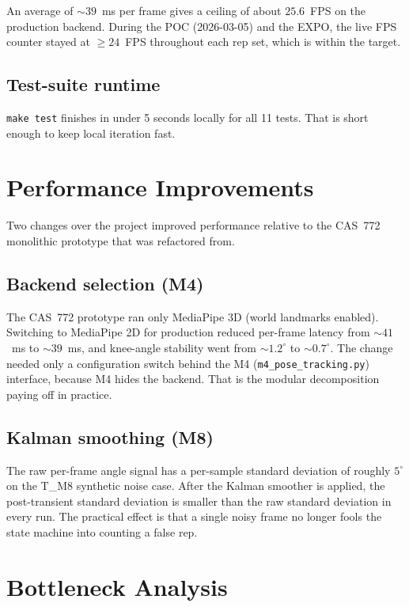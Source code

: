 \documentclass{article}
\begin{document}
An average of $\sim 39$~ms per frame gives a ceiling of about
$25.6$~FPS on the production backend. During the POC (2026-03-05) and
the EXPO, the live FPS counter stayed at $\ge 24$~FPS throughout each
rep set, which is within the target.

\subsection{Test-suite runtime}

\texttt{make test} finishes in under 5 seconds locally for all 11
tests. That is short enough to keep local iteration fast.

\section{Performance Improvements}

Two changes over the project improved performance relative to the
CAS~772 monolithic prototype that \progname{} was refactored from.

\subsection{Backend selection (M4)}

The CAS~772 prototype ran only MediaPipe 3D (world landmarks enabled).
Switching to MediaPipe 2D for production reduced per-frame latency
from $\sim 41$~ms to $\sim 39$~ms, and knee-angle stability went from
$\sim 1.2^\circ$ to $\sim 0.7^\circ$. The change needed only a
configuration switch behind the M4 (\texttt{m4\_pose\_tracking.py})
interface, because M4 hides the backend. That is the modular
decomposition paying off in practice.

\subsection{Kalman smoothing (M8)}

The raw per-frame angle signal has a per-sample standard deviation of
roughly $5^{\circ}$ on the T\_M8 synthetic noise case. After the
Kalman smoother is applied, the post-transient standard deviation is
smaller than the raw standard deviation in every run. The practical
effect is that a single noisy frame no longer fools the state machine
into counting a false rep.

\section{Bottleneck Analysis}
\end{document}
